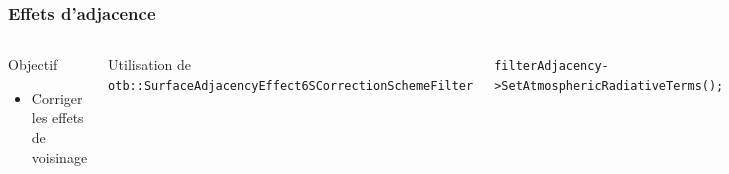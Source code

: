\documentclass[compress,handout]{beamer}
\begin{document}
\begin{frame}

  \frametitle{Effets d'adjacence}
     \begin{columns}

  \begin{block}{Objectif}
   \begin{itemize}
    \item Corriger les effets de voisinage
   \end{itemize}
  \end{block}

  \footnotesize
  Utilisation de \tiny \texttt{otb::SurfaceAdjacencyEffect6SCorrectionSchemeFilter}

  \footnotesize


  \tiny 
  \texttt{filterAdjacency->SetAtmosphericRadiativeTerms();}

  \texttt{filterAdjacency->SetZenithalViewingAngle();}

  \texttt{filterAdjacency->SetWindowRadius();}

  \texttt{filterAdjacency->SetPixelSpacingInKilometers();}

  \footnotesize
  \begin{equation*}
  \rho_{S} = \frac{ \rho_{S}^{unif}.T(\mu_{V}) - <\rho_{S}>.t_{d}(\mu_{v}) }{ exp(-\delta/\mu_{v}) }
  \end{equation*}
  \begin{itemize}
    \item $\rho_{S}^{unif}$ réflectance au sol sous hypothèse
      d'environnement uniforme
    \item $T(\mu_{V})$ transmittance vers le haut
    \item $t_{d}(\mu_{S})$ transmittance diffuse vers le haut
    \item $exp(-\delta/\mu_{v})$ transmittance directe vers le haut
    \item $<\rho_{S}>$ proportion de la contribution de l'environnement à
      la réflectance du pixel observé
  \end{itemize}

  \end{columns}
\end{frame}
\end{document}
